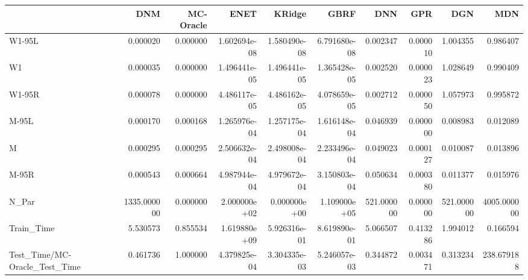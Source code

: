 \begin{tabular}{lrrrrrrrrr}
\toprule
{} &          DNM &  MC-Oracle &          ENET &        KRidge &          GBRF &         DNN &       GPR &         DGN &          MDN \\
\midrule
W1-95L                        &     0.000020 &   0.000000 &  1.602694e-08 &  1.580490e-08 &  6.791680e-08 &    0.002347 &  0.000010 &    1.004355 &     0.986407 \\
W1                            &     0.000035 &   0.000000 &  1.496441e-05 &  1.496441e-05 &  1.365428e-05 &    0.002520 &  0.000023 &    1.028649 &     0.990409 \\
W1-95R                        &     0.000078 &   0.000000 &  4.486117e-05 &  4.486162e-05 &  4.078659e-05 &    0.002712 &  0.000050 &    1.057973 &     0.995872 \\
M-95L                         &     0.000170 &   0.000168 &  1.265976e-04 &  1.257175e-04 &  1.616148e-04 &    0.046939 &  0.000000 &    0.008983 &     0.012089 \\
M                             &     0.000295 &   0.000295 &  2.506632e-04 &  2.498008e-04 &  2.233496e-04 &    0.049023 &  0.000127 &    0.010087 &     0.013896 \\
M-95R                         &     0.000543 &   0.000664 &  4.987944e-04 &  4.979672e-04 &  3.150803e-04 &    0.050634 &  0.000380 &    0.011377 &     0.015976 \\
N\_Par                         &  1335.000000 &   0.000000 &  2.000000e+02 &  0.000000e+00 &  1.109000e+05 &  521.000000 &  0.000000 &  521.000000 &  4005.000000 \\
Train\_Time                    &     5.530573 &   0.855534 &  1.619880e+09 &  5.926316e-01 &  8.619890e-01 &    5.066507 &  0.413286 &    1.994012 &     0.166594 \\
Test\_Time/MC-Oracle\_Test\_Time &     0.461736 &   1.000000 &  4.379825e-04 &  3.304335e-03 &  5.246057e-03 &    0.344872 &  0.003471 &    0.313234 &   238.679188 \\
\bottomrule
\end{tabular}
